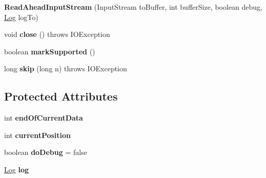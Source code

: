\begin{DoxyCompactItemize}
{\bfseries Read\+Ahead\+Input\+Stream} (Input\+Stream to\+Buffer, int buffer\+Size, boolean debug, \mbox{\hyperlink{interfacecom_1_1mysql_1_1cj_1_1log_1_1_log}{Log}} log\+To)
\item 
\mbox{\label{classcom_1_1mysql_1_1cj_1_1protocol_1_1_read_ahead_input_stream_a6837da76b0a9a3272a9b9db88fee4ecd}} 
void {\bfseries close} ()  throws I\+O\+Exception 
\item 
\mbox{\label{classcom_1_1mysql_1_1cj_1_1protocol_1_1_read_ahead_input_stream_a13106d328f8dd3c5ce653a18a7efdfd0}} 
boolean {\bfseries mark\+Supported} ()
\item 
\mbox{\label{classcom_1_1mysql_1_1cj_1_1protocol_1_1_read_ahead_input_stream_aab36ec1a6e8b9795abfd919af07d6e27}} 
long {\bfseries skip} (long n)  throws I\+O\+Exception 
\end{DoxyCompactItemize}
\subsection*{Protected Attributes}
\begin{DoxyCompactItemize}
\item 
\mbox{\label{classcom_1_1mysql_1_1cj_1_1protocol_1_1_read_ahead_input_stream_a610f1fb0f37469d11a19adbb2d2f116e}} 
int {\bfseries end\+Of\+Current\+Data}
\item 
\mbox{\label{classcom_1_1mysql_1_1cj_1_1protocol_1_1_read_ahead_input_stream_a5945549400abb32d2e8dbb686b7af786}} 
int {\bfseries current\+Position}
\item 
\mbox{\label{classcom_1_1mysql_1_1cj_1_1protocol_1_1_read_ahead_input_stream_a36c489a54865b32a5477505cc0cfdc88}} 
boolean {\bfseries do\+Debug} = false
\item 
\mbox{\label{classcom_1_1mysql_1_1cj_1_1protocol_1_1_read_ahead_input_stream_a244243ffa076d708c4f5ba1686ce5151}} 
\mbox{\hyperlink{interfacecom_1_1mysql_1_1cj_1_1log_1_1_log}{Log}} {\bfseries log}
\end{DoxyCompactItemize}


